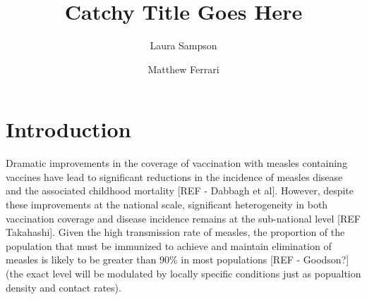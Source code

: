 \documentclass[nofootinbib,aps,pre,twocolumn,superscriptaddress,showkeys,showpacs]{revtex4-1}
\begin{document}
\title{Catchy Title Goes Here}
\author{Laura Sampson}
\author{Matthew Ferrari}

\begin{abstract}


\end{abstract}
\maketitle

\section{Introduction \label{sec:Intro}}
Dramatic improvements in the coverage of vaccination with measles containing vaccines have lead to significant reductions in the incidence of measles disease and the associated childhood mortality [REF - Dabbagh et al]. 
However, despite these improvements at the national scale, significant heterogeneity in both vaccination coverage and disease incidence remains at the sub-national level [REF Takahashi].
Given the high transmission rate of measles, the proportion of the population that must be immunized to achieve and maintain elimination of measles is likely to be greater than 90\% in most populations [REF - Goodson?] (the exact level will be modulated by locally specific conditions just as popualtion density and contact rates).
\end{document}

